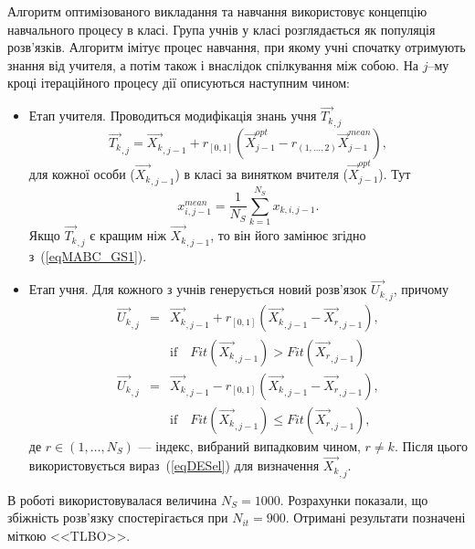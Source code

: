 Алгоритм оптимізованого викладання та навчання використовує концепцію навчального процесу в класі.
Група учнів у класі розглядається як популяція розв'язків.
Алгоритм імітує процес навчання, при якому учні спочатку отримують знання від учителя, а потім також і внаслідок спілкування між собою.
На $j$--му кроці ітераційного процесу дії описуються наступним чином\cite{TLBO_Patel}:
\begin{itemize}[leftmargin=0cm,itemindent=1em]
  \item Етап учителя.
 Проводиться модифікація знань учня $\overrightarrow{T_{k}}_{,j}$
   \begin{equation}
  \label{eqTLBOTP}
   \overrightarrow{T_{k}}_{,j}=\overrightarrow{X_{k}}_{,j-1}+r_{[0,1]}\left(\overrightarrow{X}_{j-1}^{opt}-
      r_{(1,\ldots,2)}\overrightarrow{X}_{j-1}^{mean}\right),
  \end{equation}
  для кожної особи ($\overrightarrow{X_{k}}_{,j-1}$) в класі за винятком вчителя ($\overrightarrow{X}_{j-1}^{opt}$).
  Тут
    \begin{equation}
 \label{eqTLBOMean}
  x_{i,j-1}^{mean}=\frac{1}{N_S}\sum_{k=1}^{N_S}x_{k,i,j-1}.
  \end{equation}
  Якщо $\overrightarrow{T_{k}}_{,j}$ є кращим ніж $\overrightarrow{X_{k}}_{,j-1}$, то він його замінює згідно з~(\ref{eqMABC_GS1}).



  \item Етап учня.
  Для кожного з учнів генерується новий розв'язок $\overrightarrow{U_{k}}_{,j}$, причому
\begin{eqnarray}
 \label{eqTLBOLP}
 \overrightarrow{U_{k}}_{,j}&=&\overrightarrow{X_{k}}_{,j-1}+r_{[0,1]}\left(\overrightarrow{X_{k}}_{,j-1}-\overrightarrow{X_{r}}_{,j-1}\right),
\\
&& \text{if}\quad Fit(\overrightarrow{X_{k}}_{,j-1})>Fit(\overrightarrow{X_{r}}_{,j-1})
\nonumber
\\
 \label{eqTLBOLP2}
 \overrightarrow{U_{k}}_{,j}&=&\overrightarrow{X_{k}}_{,j-1}-r_{[0,1]}\left(\overrightarrow{X_{k}}_{,j-1}-\overrightarrow{X_{r}}_{,j-1}\right),
\\
&& \text{if}\quad Fit(\overrightarrow{X_{k}}_{,j-1})\leq Fit(\overrightarrow{X_{r}}_{,j-1}),
\nonumber
\end{eqnarray}
де
$r\in(1,\ldots,N_S)$ --- індекс, вибраний випадковим чином, $r\neq k$.
Після цього використовується вираз~(\ref{eqDESel}) для визначення $\overrightarrow{X_{k}}_{,j}$.
\end{itemize}
В роботі використовувалася величина $N_S=1000$.
Розрахунки показали, що збіжність розв'язку спостерігається при $N_{it}=900$.
Отримані результати позначені міткою <<TLBO>>.

